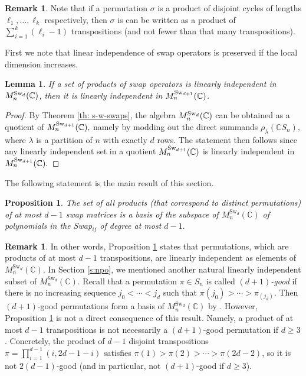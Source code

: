 \documentclass[12pt,dvipsnames,accepted=2016-08-18,a4paper,onecolumn]{quantumarticle}
\numberwithin{equation}{section}
\newcommand{\CC}{\mathbb C}
\newtheorem{lemma}[theorem]{Lemma}
\newtheorem{proposition}[theorem]{Proposition}
\theoremstyle{definition}
\newtheorem{remark}[theorem]{Remark}
\begin{document}
\begin{remark}
Note that if a permutation $\sigma$ is a product of disjoint cycles of lengths $\ell_1,\dots,\ell_k$ respectively,  then $\sigma$ is can be written as a product of $\sum_{i=1}^k(\ell_i-1)$ transpositions (and not fewer than that many transpositions).
\end{remark}

First we note that linear independence of swap operators is preserved if the local dimension increases.

\begin{lemma}\label{cor:lin-indep}
If a set of products of swap operators is linearly independent in $M^{\text{\textnormal{Sw}}_d}_n(\mathbb{C})$, then it is linearly independent in $M^{\text{\textnormal{Sw}}_{d+1}}_n(\mathbb{C})$.
\end{lemma}

\begin{proof}
By Theorem \ref{th: s-w-swaps}, the algebra $M^{\text{\textnormal{Sw}}_d}_n(\mathbb{C})$ can be obtained as a quotient of $M^{\text{\textnormal{Sw}}_{d+1}}_n(\mathbb{C}),$ namely by modding out the direct summands $\rho_{\lambda} (\mathbb{C}S_n),$ where $\lambda$ is a partition of $n$ with exactly $d$ rows. 
The statement then follows since any linearly independent set in a quotient $M^{\text{\textnormal{Sw}}_{d+1}}_n(\mathbb{C})$ is linearly independent in $M^{\text{\textnormal{Sw}}_{d+1}}_n(\mathbb{C}).$
\end{proof}

The following statement is the main result of this section.

\begin{proposition}\label{prop:d-1-indep}
	The set of all products (that correspond to distinct permutations) of at most $d-1$ swap matrices 
	is a basis of the subspace of $M^{\text{Sw}_d}_n(\mathbb{C})$ of polynomials in the Swap$_{ij}$ of degree at most $d-1.$ 
\end{proposition}

\begin{remark}
In other words, Proposition \ref{prop:d-1-indep} states that permutations, which are products of at most $d-1$ transpositions, are linearly independent as elements of $M^{\text{Sw}_d}_n(\mathbb{C})$.
In Section \ref{s:npo}, we mentioned another natural linearly independent subset of $M^{\text{Sw}_d}_n(\mathbb{C})$. Recall that a permutation $\pi\in S_n$ is called \textit{$(d+1)$-good} if there is no increasing sequence $j_0<\cdots<j_d$ such that $\pi(j_0)>\cdots>\pi_(j_d)$. Then $(d+1)$-good permutations form a basis of $M^{\text{Sw}_d}_n(\CC)$ by \cite[Theorem 8]{Pro21}.
However, Proposition \ref{prop:d-1-indep} is not a direct consequence of this result. Namely, a product of at most $d-1$ transpositions is not necessarily a $(d+1)$-good permutation if $d\ge 3$. Concretely, the product of $d-1$ disjoint transpositions $\pi=\prod_{i=1}^{d-1}(i,2d-1-i)$ satisfies $\pi(1)>\pi(2)>\cdots>\pi(2d-2)$, so it is not $2(d-1)$-good (and in particular, not $(d+1)$-good if $d\ge3$).
\end{remark}
\end{document}
